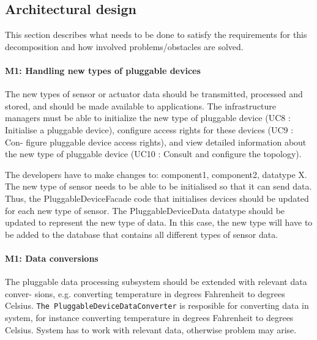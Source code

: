 \subsection{Architectural design}
    This section describes what needs to be done to satisfy the requirements for
    this decomposition and how involved problems/obstacles are solved.


    \paragraph{M1: Handling new types of pluggable devices}
        The new types of sensor or actuator data should be transmitted, processed and stored,
        and should be made available to applications. The infrastructure managers must be able to initialize the new type of pluggable device
        (UC8 : Initialise a pluggable device), configure access rights for these devices (UC9 : Con-
        figure pluggable device access rights), and view detailed information about the new type
        of pluggable device (UC10 : Consult and configure the topology).

        The developers have to make changes to: component1, component2, datatype X.
        The new type of sensor needs to be able to be initialised so that it can send data.
        Thus, the PluggableDeviceFacade code that initialises devices should be updated for
        each new type of sensor. The PluggableDeviceData datatype should be updated to
        represent the new type of data. In this case, the new type will have to be added
        to the database that contains all different types of sensor data.

    \paragraph{M1: Data conversions}
        The pluggable data processing subsystem should be extended with relevant data conver-
        sions, e.g. converting temperature in degrees Fahrenheit to degrees Celsius.
        \texttt{The PluggableDeviceDataConverter} is resposible for converting data
        in system, for instance converting temperature in degrees Fahrenheit
        to degrees Celsius. System has to work with relevant data,
        otherwise problem may arise.

